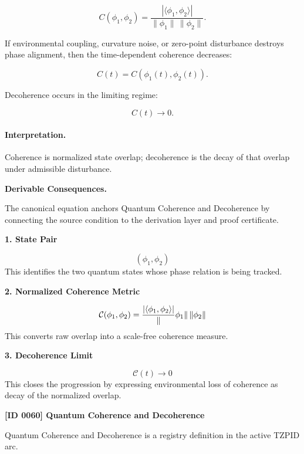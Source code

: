 \begin{equation}
C(\phi_1,\phi_2)
=
\frac{
|\langle \phi_1,\phi_2\rangle|
}{
\|\phi_1\|\,\|\phi_2\|
}.
\end{equation}

If environmental coupling, curvature noise, or zero-point disturbance destroys phase alignment, then the time-dependent coherence decreases:

\begin{equation}
C(t)
=
C(\phi_1(t),\phi_2(t)).
\end{equation}

Decoherence occurs in the limiting regime:

\begin{equation}
\boxed{
C(t)\rightarrow 0 .
}
\end{equation}

\paragraph{Interpretation.}
Coherence is normalized state overlap; decoherence is the decay of that overlap under admissible disturbance.

\par\vspace{0.35em}
\noindent\textbf{Derivable Consequences.}\quad
\begingroup
\footnotesize
\raggedright
The canonical equation anchors Quantum Coherence and Decoherence by connecting the source condition to the derivation layer and proof certificate.
\par\endgroup

\noindent\textbf{1. State Pair}\par
\[
(\phi_{1},\phi_{2})
\]
\noindent This identifies the two quantum states whose phase relation is being tracked.\par
\noindent\textbf{2. Normalized Coherence Metric}\par
\[
\mathcal{C}(\phi_{1},\phi_{2})
=
\frac{\left|\langle \phi_{1},\phi_{2}\rangle\right|}
\lVert\phi_{1}\rVert\,\lVert\phi_{2}\rVert
\]
\noindent This converts raw overlap into a scale-free coherence measure.\par
\noindent\textbf{3. Decoherence Limit}\par
\[
\mathcal{C}(t) \to 0
\]
\noindent This closes the progression by expressing environmental loss of coherence as decay of the normalized overlap.\par

\clearpage
\noindent\textbf{[ID 0060] Quantum Coherence and Decoherence}\par
\vspace{0.35em}
\begingroup\small
{}
Quantum Coherence and Decoherence is a registry definition in the active TZPID arc.


